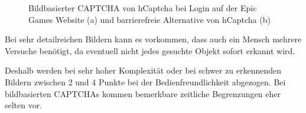 \begin{figure}[h!]
    \centering
 \caption{Bildbasierter CAPTCHA von hCaptcha bei Login auf der Epic Games Website (a) und barrierefreie Alternative von hCaptcha (b)}
      \label{fig:fortnite}
\end{figure}

Bei sehr detailreichen Bildern kann es vorkommen, dass auch ein Mensch mehrere Versuche benötigt, da eventuell nicht jedes gesuchte Objekt sofort erkannt wird.

Deshalb werden bei sehr hoher Komplexität oder bei schwer zu erkennenden Bildern zwischen 2 und 4 Punkte bei der Bedienfreundlichkeit abgezogen.
Bei bildbasierten CAPTCHAs kommen bemerkbare zeitliche Begrenzungen eher selten vor. 

